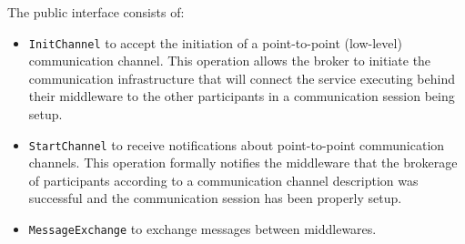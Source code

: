 
The public interface consists of:
\begin{itemize}
\item \texttt{InitChannel} to accept the initiation of a
  point-to-point (low-level) communication channel.
  This operation allows the broker to initiate the communication
  infrastructure that will connect the service executing behind their
  middleware to the other participants in a communication session
  being setup.
\item \texttt{StartChannel} to receive notifications about point-to-point
  communication channels.
  This operation formally notifies the middleware that the
  brokerage of participants according to a communication channel
  description was successful and the communication session has been
  properly setup.
\item \texttt{MessageExchange} to exchange messages between middlewares.
\end{itemize}



